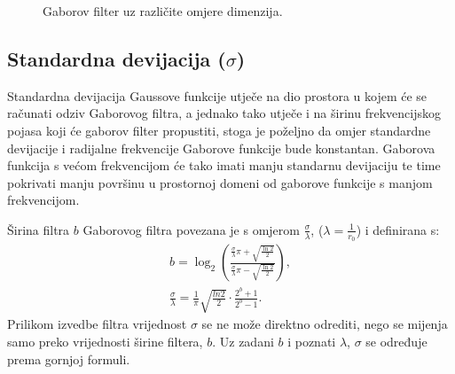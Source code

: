 \documentclass{article}
\begin{document}
\begin{figure}[h!tb]
\centering
{}
\hspace{50pt}
\caption{Gaborov filter uz različite omjere dimenzija.}
\label{fig:filter-ratios}
\end{figure}

\subsection{Standardna devijacija ($\sigma$)}
Standardna devijacija Gaussove funkcije utječe na dio prostora u kojem će se
računati odziv Gaborovog filtra, a jednako tako utječe i na širinu
frekvencijskog pojasa koji će gaborov filter propustiti, stoga je poželjno da
omjer standardne devijacije i radijalne frekvencije Gaborove funkcije bude
konstantan. Gaborova funkcija s većom frekvencijom će tako imati
manju standarnu devijaciju te time pokrivati manju površinu u prostornoj domeni
od gaborove funkcije s manjom frekvencijom. 

Širina filtra $b$ Gaborovog filtra povezana je s omjerom
$\frac{\sigma}{\lambda}$, ($\lambda = \frac{1}{r_0}$) i definirana s:
\begin{eqnarray}
b = \log_2{\left ( \frac{\frac{\sigma}{\lambda}\pi + \sqrt{\frac{\ln2}{2}}}
{\frac{\sigma}{\lambda}\pi - \sqrt{\frac{\ln2}{2}}} \right )}, \\
\frac{\sigma}{\lambda} =
\frac{1}{\pi}\sqrt{\frac{ln2}{2}}\cdot\frac{2^b+1}{2^b-1}.
\end{eqnarray}
Prilikom izvedbe filtra vrijednost $\sigma$ se ne može direktno
odrediti, nego se mijenja samo preko vrijednosti širine filtera,
$b$. Uz zadani $b$ i poznati $\lambda$, $\sigma$ se određuje prema gornjoj
formuli.
 
\end{document}
